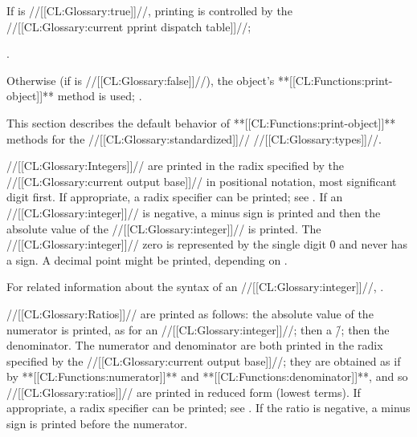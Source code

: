 If  is //[[CL:Glossary:true]]//,  printing is controlled by the //[[CL:Glossary:current pprint dispatch table]]//;

\seesection\PPrintDispatchTables.

Otherwise (if  is //[[CL:Glossary:false]]//), the object's **[[CL:Functions:print-object]]** method is used; \seesection\DefaultPrintObjMeths.

\endsubsection%

 

This section describes the default behavior of  **[[CL:Functions:print-object]]** methods for the //[[CL:Glossary:standardized]]// //[[CL:Glossary:types]]//.


 

//[[CL:Glossary:Integers]]// are printed in the radix specified by the //[[CL:Glossary:current output base]]// in positional notation, most significant digit first. If appropriate, a radix specifier can be printed; see . If an //[[CL:Glossary:integer]]// is negative, a minus sign is printed and then the absolute value of the //[[CL:Glossary:integer]]// is printed. The //[[CL:Glossary:integer]]// zero is represented by the single digit \f{0} and never has a sign. A decimal point might be printed,  depending on .

For related information about the syntax of an //[[CL:Glossary:integer]]//, \seesection\SyntaxOfIntegers.

\endsubsubsubsection%

//[[CL:Glossary:Ratios]]// are printed as follows: the absolute value of the numerator is printed, as for an //[[CL:Glossary:integer]]//; then a \f{/}; then the denominator.  The numerator and denominator are both printed in the radix specified by the //[[CL:Glossary:current output base]]//;  they are obtained as if by **[[CL:Functions:numerator]]** and **[[CL:Functions:denominator]]**, and so //[[CL:Glossary:ratios]]// are printed in reduced form (lowest terms). If appropriate, a radix specifier can be printed; see  . If the ratio is negative, a minus sign is printed before the numerator.

